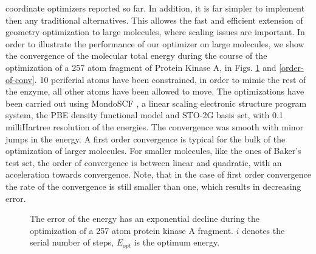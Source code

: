 \documentclass[prl,aps,twocolumn,showpacs,twocolumngrid,superbib]{revtex4}
\begin{document}
coordinate optimizers reported so far. In addition, it is far simpler
to implement then any traditional alternatives.
This allowes the fast and efficient 
extension of geometry optimization 
to large molecules, where scaling issues are important.
In order to illustrate the performance of our optimizer on large
molecules, we show the convergence of the molecular total energy
during the course of the optimization of a 257 atom
fragment of Protein Kinase A, in Figs. \ref{logn-logde} 
and \ref{order-of-conv}. 10 periferial atoms have been 
constrained, in order to mimic the rest of the enzyme, 
all other atoms have been allowed to move.
The optimizations have been carried out 
using MondoSCF \cite{MondoSCF}, a linear scaling electronic structure
program system, the PBE density functional model and 
STO-2G basis set, with 0.1 milliHartree resolution of the energies.
The convergence was smooth with minor jumps in the energy.
A first order convergence is typical for the bulk of the optimization
of larger molecules. For smaller molecules, like the ones of Baker's
test set, the order of convergence is between linear and quadratic,
with an acceleration towards convergence. Note, that in the case
of first order convergence the rate of the convergence is still
smaller than one, which results in decreasing error.
\begin{figure}[h]
\caption{
\small  
The error of the energy has an exponential decline during
the optimization of a 257 atom protein kinase A fragment. 
$i$ denotes the serial number of steps,
$E_{opt}$ is the optimum energy.
\label{logn-logde}
}
\end{figure}
%
%
\end{document}
